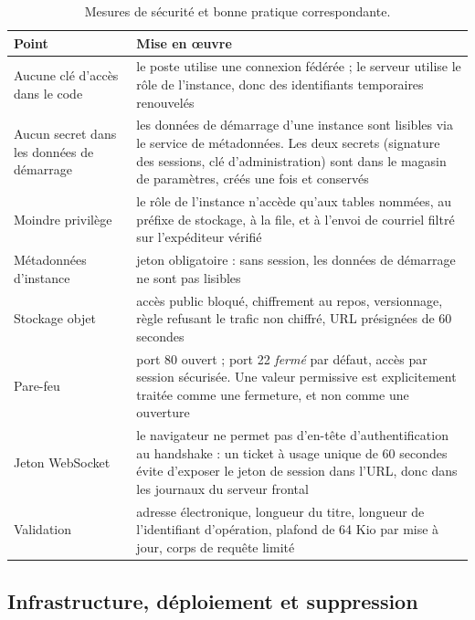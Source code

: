 \begin{table}[H]
\centering
\small
\begin{tabular}{@{}p{4.6cm}p{11cm}@{}}
\toprule
\textbf{Point} & \textbf{Mise en œuvre} \\
\midrule
Aucune clé d'accès dans le code
& le poste utilise une connexion fédérée ; le serveur utilise le rôle de
  l'instance, donc des identifiants temporaires renouvelés \\
\addlinespace
Aucun secret dans les données de démarrage
& les données de démarrage d'une instance sont lisibles via le service de
  métadonnées. Les deux secrets (signature des sessions, clé d'administration)
  sont dans le magasin de paramètres, créés une fois et conservés \\
\addlinespace
Moindre privilège
& le rôle de l'instance n'accède qu'aux tables nommées, au préfixe de stockage,
  à la file, et à l'envoi de courriel filtré sur l'expéditeur vérifié \\
\addlinespace
Métadonnées d'instance
& jeton obligatoire : sans session, les données de démarrage ne sont pas
  lisibles \\
\addlinespace
Stockage objet
& accès public bloqué, chiffrement au repos, versionnage, règle refusant le
  trafic non chiffré, URL présignées de 60 secondes \\
\addlinespace
Pare-feu
& port 80 ouvert ; port 22 \emph{fermé} par défaut, accès par session
  sécurisée. Une valeur permissive est explicitement traitée comme une
  fermeture, et non comme une ouverture \\
\addlinespace
Jeton WebSocket
& le navigateur ne permet pas d'en-tête d'authentification au handshake : un
  ticket à usage unique de 60 secondes évite d'exposer le jeton de session dans
  l'URL, donc dans les journaux du serveur frontal \\
\addlinespace
Validation
& adresse électronique, longueur du titre, longueur de l'identifiant
  d'opération, plafond de 64 Kio par mise à jour, corps de requête limité \\
\bottomrule
\end{tabular}
\caption{Mesures de sécurité et bonne pratique correspondante.}
\label{tab:securite}
\end{table}

\subsection{Infrastructure, déploiement et suppression}

